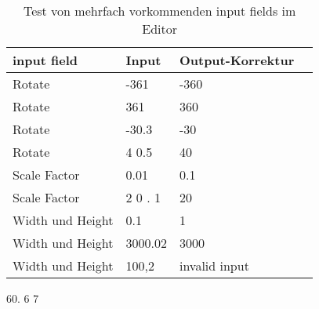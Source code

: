 \begin{table}[!htbp]
	\centering
	\begin{tabular}{|p{4cm}|p{3cm}|p{3cm}|p{3cm}|}
		\hline
		\textbf{input field}	& \textbf{Input} 	& \textbf{Output-Korrektur}		\\ 
		\hline
		Rotate					& -361 						& -360  				\\
		Rotate					& 361 						& 360 					\\ 
		Rotate					& -30.3 					& -30  					\\
		Rotate					& 4 0.5 					& 40 					\\ 
		Scale Factor			& 0.01						& 0.1 					\\
		Scale Factor			& 2 0 . 1					& 20 					\\
		Width und Height		& 0.1						& 1 					\\
		Width und Height		& 3000.02					& 3000 					\\
		Width und Height		& 100,2						& invalid input 		\\
		\hline
	\end{tabular}
	\caption{Test von mehrfach vorkommenden input fields im Editor}
	\label{table:editor-input}
\end{table}

60. 6 7